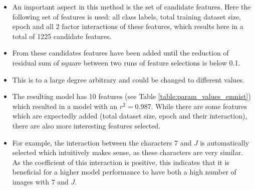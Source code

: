 \documentclass{article} %
\begin{document}
\begin{itemize}
    \item An important aspect in this method is the set of candidate features. Here the following set of features is used: all class labels, total training dataset size, epoch and all 2 factor interactions of these features, which results here in a total of 1225 candidate features.
    \item From these candidates features have been added until the reduction of residual sum of square between two runs of feature selections is below 0.1.
    \item This is to a large degree arbitrary and could be changed to different values.  
    \item The resulting model has 10 features (see Table \ref{table:param_values_emnist}) which resulted in a model with an $r^2 = 0.987$. While there are some features which are expectedly added (total dataset size, epoch and their interaction), there are also more interesting features selected.
    \item For example, the interaction between the characters $7$ and $J$ is automatically selected which intuitively makes sense, as these characters are very similar. As the coefficient of this interaction is positive, this indicates that it is beneficial for a higher model performance to have both a high number of images with $7$ and $J$.
\end{itemize}
\end{document}
